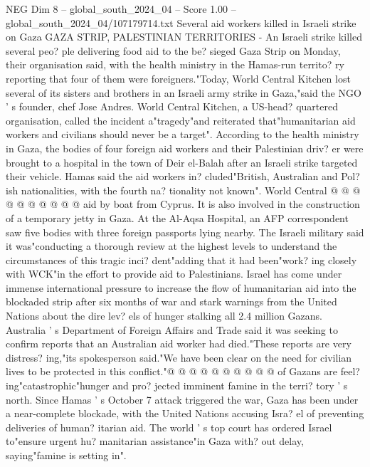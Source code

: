 \begin{textsample}{NEG Dim 8 – global\_south\_2024\_04 – Score 1.00 – global\_south\_2024\_04/107179714.txt}  \label{ex:f8_neg_264}
Several aid workers killed in Israeli strike on Gaza GAZA STRIP, PALESTINIAN TERRITORIES - An Israeli strike killed several peo? ple delivering food aid to the be? sieged Gaza Strip on Monday, their organisation said, with the health ministry in the Hamas-run territo? ry reporting that four of them were foreigners."Today, World Central Kitchen lost several of its sisters and brothers in an Israeli army strike in Gaza,"said the NGO ' s founder, chef Jose Andres.
World Central Kitchen, a US-head? quartered organisation, called the incident a"tragedy"and reiterated that"humanitarian aid workers and civilians should never be a target".
According to the health ministry in Gaza, the bodies of four foreign aid workers and their Palestinian driv? er were brought to a hospital in the town of Deir el-Balah after an Israeli strike targeted their vehicle.
Hamas said the aid workers in? cluded"British, Australian and Pol? ish nationalities, with the fourth na? tionality not known".
World Central @ @ @ @ @ @ @ @ @ @ aid by boat from Cyprus.
It is also involved in the construction of a temporary jetty in Gaza.
At the Al-Aqsa Hospital, an AFP correspondent saw five bodies with three foreign passports lying nearby.
The Israeli military said it was"conducting a thorough review at the highest levels to understand the circumstances of this tragic inci? dent"adding that it had been"work? ing closely with WCK"in the effort to provide aid to Palestinians.
Israel has come under immense international pressure to increase the flow of humanitarian aid into the blockaded strip after six months of war and stark warnings from the United Nations about the dire lev? els of hunger stalking all 2.4 million Gazans.
Australia ' s Department of Foreign Affairs and Trade said it was seeking to confirm reports that an Australian aid worker had died."These reports are very distress? ing,"its spokesperson said."We have been clear on the need for civilian lives to be protected in this conflict."@ @ @ @ @ @ @ @ @ @ of Gazans are feel? ing"catastrophic"hunger and pro? jected imminent famine in the terri? tory ' s north.
Since Hamas ' s October 7 attack triggered the war, Gaza has been under a near-complete blockade, with the United Nations accusing Isra? el of preventing deliveries of human? itarian aid.
The world ' s top court has ordered Israel to"ensure urgent hu? manitarian assistance"in Gaza with? out delay, saying"famine is setting in".

\end{textsample}

